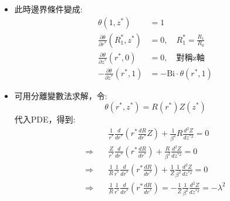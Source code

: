 \documentclass[../main.tex]{subfiles}
\begin{document}
\begin{itemize}
\begin{itemize}
\begin{align}
        \Rightarrow\quad & \frac{1}{r^\ast}\frac{\partial}{\partial r^\ast}\left(
          r^\ast \frac{\partial T}{\partial r^\ast}
        \right) + \frac{R_0^2}{B^2} \frac{\partial^2 T}{\partial z^{\ast 2}} = 0 \label{eq:circular_fin_Bessel_2D_PDE}
      \end{align}
      於是我們令$\beta= \frac{B}{R_0}$，則(\ref{eq:circular_fin_Bessel_2D_PDE})式變成:
      \begin{equation}
        \frac{1}{r^\ast}\frac{\partial}{\partial r^\ast}\left(
          r^\ast \frac{\partial T}{\partial r^\ast}
        \right) + \frac{1}{\beta^2} \frac{\partial^2 T}{\partial z^{\ast 2}} = 0
      \end{equation}
      \item 此時邊界條件變成:
      \begin{align}
         \theta(1, z^\ast) &= 1 \\
         \frac{\partial \theta}{\partial r^\ast}(R_1^\ast,z^\ast) &= 0,\quad R_1^\ast = \frac{R_1}{R_0}\\
         \frac{\partial \theta}{\partial z^\ast}(r^\ast,0) &= 0,\quad\text{對稱z軸}\\
         -\frac{\partial \theta}{\partial z^\ast}(r^\ast, 1)& = -\text{Bi} \cdot \theta(r^\ast, 1)
      \end{align}
      \item 可用分離變數法求解，令:
      \begin{equation}
        \theta(r^\ast, z^\ast) = R(r^\ast) Z(z^\ast)
      \end{equation}
      代入PDE，得到:
      \begin{align}
        & \frac{1}{r^\ast}\frac{d}{dr^\ast}\left(
          r^\ast \frac{dR}{dr^\ast} Z
        \right) + \frac{1}{\beta^2} R \frac{d^2 Z}{d z^{\ast 2}} = 0 \nonumber\\
        \Rightarrow\quad & \frac{Z}{r^\ast}\frac{d}{dr^\ast}\left(
          r^\ast \frac{dR}{dr^\ast}
        \right) + \frac{R}{\beta^2} \frac{d^2 Z}{d z^{\ast 2}} = 0 \nonumber\\
        \Rightarrow\quad & \frac{1}{R}\frac{1}{r^\ast}\frac{d}{dr^\ast}\left(
          r^\ast \frac{dR}{dr^\ast}
        \right) + \frac{1}{Z}\frac{1}{\beta^2} \frac{d^2 Z}{d z^{\ast 2}} = 0 \nonumber\\
        \Rightarrow\quad & \frac{1}{R}\frac{1}{r^\ast}\frac{d}{dr^\ast}\left(
          r^\ast \frac{dR}{dr^\ast}
        \right) = - \frac{1}{Z}\frac{1}{\beta^2} \frac{d^2 Z}{d z^{\ast 2}} = -\lambda^2
      \end{align}

\end{itemize}
\end{itemize}
\end{document}
